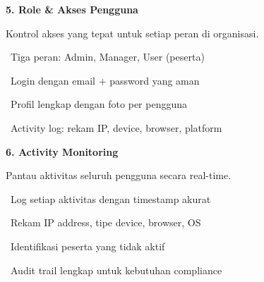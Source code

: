 \documentclass[a4paper]{article}
\begin{document}
\vspace{8pt}

\noindent
\begin{minipage}[t]{0.485\textwidth}
    \colorbox{OrangePrimary}{%
        \begin{minipage}{\dimexpr\textwidth-2\fboxsep\relax}
            {\fontsize{10}{13}\selectfont\bfseries\color{White} 5. Role \& Akses Pengguna}
        \end{minipage}}\par
    \vspace{4pt}
    {\fontsize{9}{12}\selectfont\color{TextDark}%
    Kontrol akses yang tepat untuk setiap peran di organisasi.\par\vspace{3pt}
    \textbullet\ Tiga peran: Admin, Manager, User (peserta)\par\vspace{2pt}%
    \textbullet\ Login dengan email + password yang aman\par\vspace{2pt}%
    \textbullet\ Profil lengkap dengan foto per pengguna\par\vspace{2pt}%
    \textbullet\ Activity log: rekam IP, device, browser, platform}%
\end{minipage}%
\hfill
\begin{minipage}[t]{0.485\textwidth}
    \colorbox{VioletDark}{%
        \begin{minipage}{\dimexpr\textwidth-2\fboxsep\relax}
            {\fontsize{10}{13}\selectfont\bfseries\color{White} 6. Activity Monitoring}
        \end{minipage}}\par
    \vspace{4pt}
    {\fontsize{9}{12}\selectfont\color{TextDark}%
    Pantau aktivitas seluruh pengguna secara real-time.\par\vspace{3pt}
    \textbullet\ Log setiap aktivitas dengan timestamp akurat\par\vspace{2pt}%
    \textbullet\ Rekam IP address, tipe device, browser, OS\par\vspace{2pt}%
    \textbullet\ Identifikasi peserta yang tidak aktif\par\vspace{2pt}%
    \textbullet\ Audit trail lengkap untuk kebutuhan compliance}%
\end{minipage}
\end{document}
